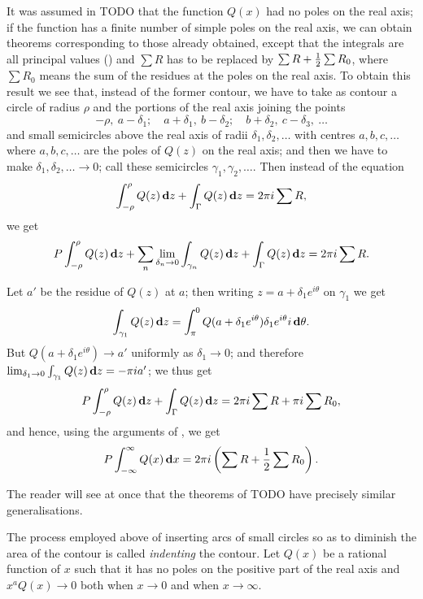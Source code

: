 It was assumed in TODO that the function $Q(x)$ had no
poles on the real axis; if the function has a finite number of simple
poles on the real axis, we can obtain theorems corresponding to those
already obtained, except that the integrals are all principal values
() and $\sum R$ has to be replaced by
$\sum R + \frac{1}{2} \sum R_{0}$, where $\sum R_{0}$ means the
sum of the residues at the poles on the real axis. To obtain this
result we see that, instead of the former contour, we have to take as
contour a circle of radius $\rho$ and the portions of the real axis joining
the points
$$
-\rho, \ a-\delta_{1};
\quad
a+\delta_{1}, \ b-\delta_{2};
\quad
b+\delta_{2}, \ c-\delta_{3},
\ \ldots
$$
and small semicircles above the real axis of radii
$\delta_{1},\delta_{2},\ldots$ with
centres $a, b, c, \ldots$ where $a, b, c, \ldots$ are the poles of
$Q(z)$ on the real axis; and then we have to make
$\delta_{1}, \delta_{2}, \ldots \rightarrow 0$;
call these semicircles $\gamma_{1},\gamma_{2},\ldots$.
Then instead of the equation
$$
\int_{-\rho}^{\rho} Q(z) \, \mathbf{d} z
+
\int_{\Gamma} Q(z) \, \mathbf{d} z
=
2 \pi i \sum R,
$$
we get
$$
P \int_{-\rho}^{\rho} Q(z) \, \mathbf{d} z
+
\sum_{n}
\lim_{\delta_{n} \rightarrow 0}
\int_{\gamma_{n}} Q(z) \, \mathbf{d} z
+
\int_{\Gamma} Q(z) \, \mathbf{d} z
=
2 \pi i \sum R.
$$

Let $a'$ be the residue of $Q(z)$ at $a$; then writing
$z = a + \delta_{1} e^{i\theta}$ on $\gamma_{1}$ we get
$$
\int_{\gamma_{1}} Q(z) \, \mathbf{d} z
=
\int_{\pi}^{0}
Q(a + \delta_{1} e^{i\theta})
\delta_{1} e^{i\theta} i \, \mathbf{d} \theta.
$$
But $Q(a + \delta_{1} e^{i\theta}) \rightarrow a'$ 
uniformly as $\delta_{1} \rightarrow 0$; and therefore
$
\lim_{\delta_{1} \rightarrow 0} \int_{\gamma_{1}} Q(z) \, \mathbf{d} z
=
- \pi i a'
$;
we thus get
$$
P \int_{-\rho}^{\rho} Q(z) \, \mathbf{d} z
+
\int_{\Gamma} Q(z) \, \mathbf{d} z
=
2 \pi i \sum R
+
\pi i \sum R_{0},
$$
and hence, using the arguments of , we get
$$
P \int_{-\infty}^{\infty} Q(x) \, \mathbf{d} x
=
2 \pi i \left(  \sum R + \frac{1}{2} \sum R_{0}  \right).
$$

The reader will see at once that the theorems of TODO have
precisely similar generalisations.

The process employed above of inserting arcs of small circles so as to
diminish the area of the contour is called \emph{indenting} the contour.
Let $Q(x)$ be a rational function of $x$ such that it has no poles on the
positive part of the real axis and
$x^{a} Q(x) \rightarrow 0$ both when $x \rightarrow 0$ and when
$x \rightarrow \infty$.

